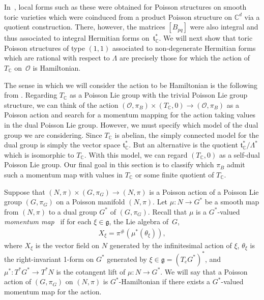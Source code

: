 \documentclass[10pt,a4paper]{amsart}
\numberwithin{equation}{section}
\begin{document}
In~\cite{Caine}, local forms such as these were obtained for Poisson structures on smooth toric varieties which were coinduced from a product Poisson structure on ${\mathbb C}^d$ via a quotient construction. There, however, the matrices $[B_{pq}]$ were also integral and thus associated to integral Hermitian forms on~${\mathfrak t}_{\mathbb C}^*$. We will next show that toric Poisson structures of type $(1,1)$ associated to non-degenerate Hermitian forms which are rational with respect to $\Lambda$ are precisely those for which the action of~$T_{\mathbb C}$ on~$\mathcal O$ is Hamiltonian.

The sense in which we will consider the action to be Hamiltonian is the following from \cite{Lu}. Regarding $T_{\mathbb C}$ as a Poisson Lie group with the trivial Poisson Lie group structure, we can think of the action $ (\mathcal O,\pi_B)\times (T_{\mathbb C},0) \to (\mathcal O,\pi_B)$ as a Poisson action and search for a momentum mapping for the action taking values in the dual Poisson Lie group. However, we must specify which model of the dual group we are considering. Since $T_{\mathbb C}$ is abelian, the simply connected model for the dual group is simply the vector space ${\mathfrak t}_{\mathbb C}^*$. But an alternative is the quotient ${\mathfrak t}_{\mathbb C}^*/\Lambda^*$ which is isomorphic to $T_{\mathbb C}$. With this model, we can regard $(T_{\mathbb C},0)$ as a self-dual Poisson Lie group. Our f\/inal goal in this section is to classify which $\pi_B$ admit such a momentum map with values in $T_{\mathbb C}$ or some f\/inite quotient of $T_{\mathbb C}$.

Suppose that $(N,\pi)\times (G,\pi_G)\to (N,\pi)$ is a Poisson action of a Poisson Lie group $(G,\pi_G)$ on a Poisson manifold $(N,\pi)$. Let $\mu\colon N\to G^*$ be a smooth map from $(N,\pi)$ to a dual group $G^*$ of $(G,\pi_G)$. Recall that $\mu$ is a $G^*$-valued \emph{momentum map}~\cite{Lu} if for each $\xi\in{\mathfrak g}$, the Lie algebra of~$G$,
\begin{gather}\label{differential condition}
X_\xi=\pi^\#(\mu^*(\theta_\xi)),
\end{gather}
where $X_\xi$ is the vector f\/ield on $N$ generated by the inf\/initesimal action of $\xi$, $\theta_\xi$ is the right-invariant 1-form on $G^*$ generated by $\xi\in {\mathfrak g}=(T_eG^*)^*$, and $\mu^*\colon T^*G^*\to T^*N$ is the cotangent lift of $\mu\colon N\to G^*$. We will say that a Poisson action of $(G,\pi_G)$ on $(N,\pi)$ is $G^*$-Hamiltonian if there exists a $G^*$-valued momentum map for the action.
\end{document}
